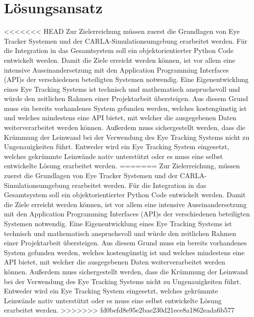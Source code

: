 \section{Lösungsansatz}

<<<<<<< HEAD
Zur Zielerreichung müssen zuerst die Grundlagen von Eye Tracker Systemen und der CARLA-Simulationsumgebung erarbeitet werden. Für die Integration in das Gesamtsystem soll ein objektorientierter Python Code entwickelt werden. Damit die Ziele erreicht werden können, ist vor allem eine intensive Auseinandersetzung mit den Application Programming Interfaces ({\acs{API}})s der verschiedenen beteiligten Systemen notwendig. Eine Eigenentwicklung eines Eye Tracking Systems ist technisch und mathematisch anspruchsvoll und würde den zeitlichen Rahmen einer Projektarbeit übersteigen. Aus diesem Grund muss ein bereits vorhandenes System gefunden werden, welches kostengünstig ist und welches mindestens eine {\acs{API}} bietet, mit welcher die ausgegebenen Daten weiterverarbeitet werden können. Außerdem muss sichergestellt werden, dass die Krümmung der Leinwand bei der Verwendung des Eye Tracking Systems nicht zu Ungenauigkeiten führt. Entweder wird ein Eye Tracking System eingesetzt, welches gekrümmte Leinwände nativ unterstützt oder es muss eine selbst entwickelte Lösung erarbeitet werden. 
=======
Zur Zielerreichung, müssen zuerst die Grundlagen von Eye Tracker Systemen und der CARLA-Simulationsumgebung erarbeitet werden. Für die Integration in das Gesamtsystem soll ein objektorientierter Python Code entwickelt werden. Damit die Ziele erreicht werden können, ist vor allem eine intensive Auseinandersetzung mit den Application Programming Interfaces ({\acs{API}})s der verschiedenen beteiligten Systemen notwendig. Eine Eigenentwicklung eines Eye Tracking Systems ist technisch und mathematisch anspruchsvoll und würde den zeitlichen Rahmen einer Projektarbeit übersteigen. Aus diesem Grund muss ein bereits vorhandenes System gefunden werden, welches kostengünstig ist und welches mindestens eine {\ac{API}} bietet, mit welcher die ausgegebenen Daten weiterverarbeitet werden können. Außerdem muss sichergestellt werden, dass die Krümmung der Leinwand bei der Verwendung des Eye Tracking Systems nicht zu Ungenauigkeiten führt. Entweder wird ein Eye Tracking System eingesetzt, welches gekrümmte Leinwände nativ unterstützt oder es muss eine selbst entwickelte Lösung erarbeitet werden. 
>>>>>>> fd0befd8e95e2bae230d21ece8a1862eada6b577






